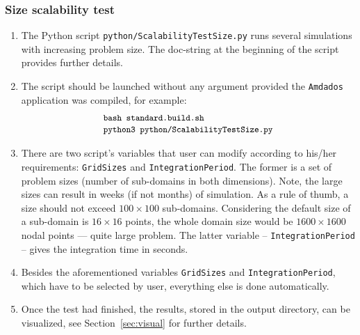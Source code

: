 \documentclass[]{article}
\begin{document}
\subsubsection{Size scalability test}
\begin{enumerate}
\item The Python script \texttt{python/ScalabilityTestSize.py} runs several simulations with increasing problem size. The doc-string at the beginning of the script provides further details.
\item The script should be launched without any argument provided the \texttt{Amdados} application was compiled, for example:
$$
\begin{array}{l}
\mbox{\small\texttt{bash standard.build.sh}} \\
\mbox{\small\texttt{python3 python/ScalabilityTestSize.py}} \\
\end{array}
$$
\item There are two script's variables that user can modify according to his/her requirements: \texttt{GridSizes} and \texttt{IntegrationPeriod}. The former is a set of problem sizes (number of sub-domains in both dimensions). Note, the large sizes can result in weeks (if not months) of simulation. As a rule of thumb, a size should not exceed $100{\times}100$ sub-domains. Considering the default size of a sub-domain is $16{\times}16$ points, the whole domain size would be $1600{\times}1600$ nodal points --- quite large problem. The latter variable -- \texttt{IntegrationPeriod} -- gives the integration time in seconds.
\item Besides the aforementioned variables \texttt{GridSizes} and \texttt{IntegrationPeriod}, \newline which have to be selected by user, everything else is done automatically.
\item Once the test had finished, the results, stored in the output directory, can be visualized, see Section~\ref{sec:visual} for further details.
\end{enumerate}
\end{document}
